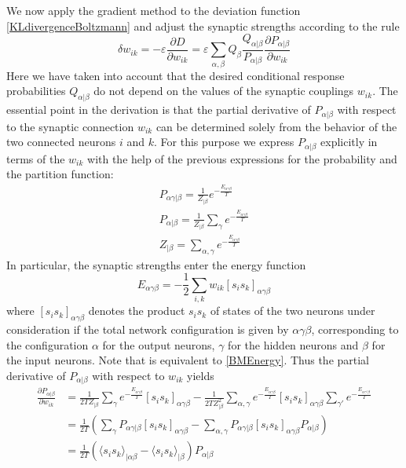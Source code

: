 We now apply the gradient method to the deviation function \eqref{KLdivergenceBoltzmann} and adjust the synaptic strengths according to the rule
\begin{equation}\label{BMdeltaw}
\delta w_{ik}=-\varepsilon\frac{\partial D}{\partial w_{ik}}=\varepsilon\sum_{\alpha,\beta}Q_\beta\frac{Q_{\alpha|\beta}}{P_{\alpha|\beta}}\frac{\partial P_{\alpha|\beta}}{\partial w_{ik}}
\end{equation}
Here we have taken into account that the desired conditional response probabilities $Q_{\alpha|\beta}$ do not depend on the values of the synaptic couplings $w_{ik}$. The essential point in the derivation is that the partial derivative of $P_{\alpha|\beta}$ with respect to the synaptic connection $w_{ik}$ can be determined solely from the behavior of the two connected neurons $i$ and $k$. For this purpose we express $P_{\alpha|\beta}$ explicitly in terms of the $w_{ik}$ with the help of the previous expressions for the probability and the partition function:
\begin{gather}
P_{\alpha\gamma|\beta}=\frac{1}{Z_{|\beta}}e^{-\frac{E_{\alpha\gamma\beta}}{T}}\\
P_{\alpha|\beta}=\frac{1}{Z_{|\beta}}\sum_\gamma e^{-\frac{E_{\alpha\gamma\beta}}{T}}\\
Z_{|\beta}=\sum_{\alpha,\gamma}e^{-\frac{E_{\alpha\gamma\beta}}{T}}
\end{gather}
In particular, the synaptic strengths enter the energy function
\begin{equation}\label{BMEnergy1}
E_{\alpha\gamma\beta}=-\frac{1}{2}\sum_{i,k}w_{ik}{[s_is_k]}_{\alpha\gamma\beta}
\end{equation}
where ${[s_is_k]}_{\alpha\gamma\beta}$ denotes the product $s_is_k$ of states of the two neurons under consideration if the total network configuration is given by $\alpha\gamma\beta$, corresponding to the configuration $\alpha$ for the output neurons, $\gamma$ for the hidden neurons and $\beta$ for the input neurons. Note that is equivalent to \eqref{BMEnergy}. Thus the partial derivative of $P_{\alpha|\beta}$ with respect to $w_{ik}$ yields
\begin{equation}
\begin{split}
\frac{\partial P_{\alpha|\beta}}{\partial w_{ik}}
&=\frac{1}{2TZ_{|\beta}}\sum_\gamma e^{-\frac{E_{\alpha\gamma\beta}}{T}}{[s_is_k]}_{\alpha\gamma\beta}-\frac{1}{2TZ_{|\beta}^2}\sum_{\alpha,\gamma}e^{-\frac{E_{\alpha\gamma\beta}}{T}}{[s_is_k]}_{\alpha\gamma\beta}\sum_{\gamma'}e^{-\frac{E_{\alpha\gamma'\beta}}{T}}\\
&=\frac{1}{2T}\left(\sum_\gamma P_{\alpha\gamma|\beta}{[s_is_k]}_{\alpha\gamma\beta}-\sum_{\alpha,\gamma}P_{\alpha\gamma|\beta}{[s_is_k]}_{\alpha\gamma\beta}P_{\alpha|\beta}\right)\\
&=\frac{1}{2T}\left({\langle s_is_k\rangle}_{|\alpha\beta}-{\langle s_is_k\rangle}_{|\beta}\right)P_{\alpha|\beta}
\end{split}
\end{equation}

